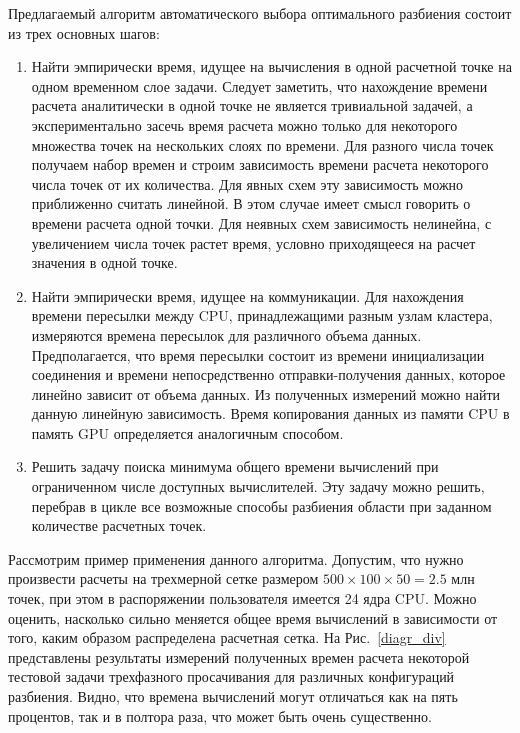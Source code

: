 Предлагаемый алгоритм автоматического выбора оптимального разбиения состоит
из трех основных шагов:
\begin{enumerate}
 \item Найти эмпирически время, идущее на вычисления в одной расчетной точке на
одном временном слое задачи. Следует заметить, что нахождение времени расчета
аналитически в одной точке не является тривиальной задачей, а экспериментально засечь
время расчета можно только для некоторого множества точек на нескольких слоях по
времени. Для разного числа точек получаем набор времен и строим зависимость времени
расчета некоторого числа точек от их количества. Для явных схем эту зависимость
можно приближенно считать линейной. В этом случае имеет смысл говорить о времени
расчета одной точки. Для неявных схем зависимость нелинейна, с увеличением числа
точек растет время, условно приходящееся на расчет значения в одной точке.
\item Найти эмпирически время, идущее на коммуникации. Для нахождения времени
пересылки между CPU, принадлежащими разным узлам кластера, измеряются времена
пересылок для различного объема данных. Предполагается, что время пересылки
состоит из времени инициализации соединения и времени непосредственно 
отправки-получения данных, которое линейно зависит от объема данных. Из полученных 
измерений можно найти данную линейную зависимость. Время копирования данных из памяти
CPU в память GPU определяется аналогичным способом.
\item Решить задачу поиска минимума общего времени вычислений при ограниченном
числе доступных вычислителей. Эту задачу можно решить, перебрав в цикле все возможные
способы разбиения области при заданном количестве расчетных точек.
\end{enumerate}
Рассмотрим пример применения данного алгоритма. Допустим, что нужно произвести
расчеты на трехмерной сетке размером $500\times100\times50=2.5$ млн точек, при этом в
распоряжении пользователя имеется 24 ядра CPU. Можно оценить, насколько сильно
меняется общее время вычислений в зависимости от того, каким образом распределена
расчетная сетка. На Рис.~\ref{diagr_div} представлены результаты измерений полученных времен 
расчета некоторой тестовой задачи трехфазного просачивания для различных конфигураций разбиения.
Видно, что времена вычислений могут отличаться как на пять процентов,
так и в полтора раза, что может быть очень существенно.


